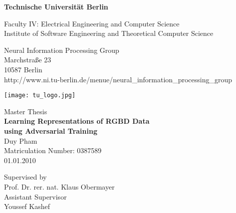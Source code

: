 \thispagestyle{empty}
\begin{center}

\vspace*{1.4cm}
{\LARGE \textbf{Technische Universit{\"a}t Berlin}}

\vspace{0.5cm}

{\large Faculty IV: Electrical Engineering and Computer Science\\[1mm]}
{\large Institute of Software Engineering and Theoretical Computer Science\\[5mm]}

Neural Information Processing Group\\
Marchstra{\ss}e 23\\
10587 Berlin\\
http://www.ni.tu-berlin.de/menue/neural\_information\_processing\_group\\

\vspace*{1cm}

\texttt{[image: tu\_logo.jpg]}

\vspace*{1.0cm}

{\LARGE Master Thesis}\\

\vspace{1.0cm}
{\LARGE \textbf{Learning Representations of RGBD Data}}\\
\vspace*{0.3cm}
{\LARGE \textbf{using Adversarial Training}}\\
\vspace*{1.0cm}
{\LARGE Duy Pham}
\\
\vspace*{0.5cm}
Matriculation Number: 0387589\\
01.01.2010\\ %
\vspace*{1.0cm}

Supervised by\\
Prof. Dr. rer. nat. Klaus Obermayer\\
\vspace*{0.5cm}
Assistant Supervisor\\
Youssef Kashef
\vspace{3cm}


\end{center}

